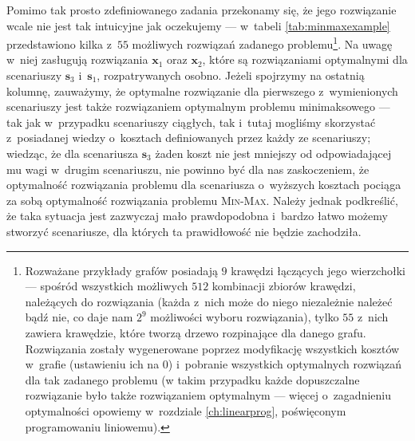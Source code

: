 Pomimo tak prosto zdefiniowanego zadania przekonamy się, że jego rozwiązanie wcale nie jest tak intuicyjne jak oczekujemy --- w~tabeli \ref{tab:minmaxexample} przedstawiono kilka z~$55$ możliwych rozwiązań zadanego problemu\footnote{
	Rozważane przykłady grafów posiadają $9$ krawędzi łączących jego wierzchołki --- spośród wszystkich możliwych $512$ kombinacji zbiorów krawędzi, należących do rozwiązania (każda z~nich może do niego niezależnie należeć bądź nie, co daje nam $2^{9}$ możliwości wyboru rozwiązania), tylko $55$ z~nich zawiera krawędzie, które tworzą drzewo rozpinające dla danego grafu.
	Rozwiązania zostały wygenerowane poprzez modyfikację wszystkich kosztów w~grafie (ustawieniu ich na $0$) i~pobranie wszystkich optymalnych rozwiązań dla tak zadanego problemu (w takim przypadku każde dopuszczalne rozwiązanie było także rozwiązaniem optymalnym --- więcej o~zagadnieniu optymalności opowiemy w~rozdziale \ref{ch:linearprog}, poświęconym programowaniu liniowemu).}.
Na uwagę w~niej zasługują rozwiązania $\textbf{x}_{1}$ oraz $\textbf{x}_{2}$, które są rozwiązaniami optymalnymi dla scenariuszy $\textbf{s}_{3}$ i~$\textbf{s}_{1}$, rozpatrywanych osobno.
Jeżeli spojrzymy na ostatnią kolumnę, zauważymy, że optymalne rozwiązanie dla pierwszego z~wymienionych scenariuszy jest także rozwiązaniem optymalnym problemu minimaksowego --- tak jak w~przypadku scenariuszy ciągłych, tak i~tutaj mogliśmy skorzystać z~posiadanej wiedzy o~kosztach definiowanych przez każdy ze scenariuszy; wiedząc, że dla scenariusza $\textbf{s}_{3}$ żaden koszt nie jest mniejszy od odpowiadającej mu wagi w~drugim scenariuszu, nie powinno być dla nas zaskoczeniem, że optymalność rozwiązania problemu dla scenariusza o~wyższych kosztach pociąga za sobą optymalność rozwiązania problemu \textsc{Min-Max}.
Należy jednak podkreślić, że taka sytuacja jest zazwyczaj mało prawdopodobna i~bardzo łatwo możemy stworzyć scenariusze, dla których ta prawidłowość nie będzie zachodziła.

